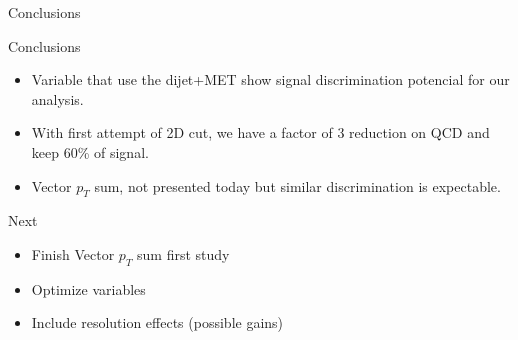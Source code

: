 \documentclass[8pt]{beamer}
\begin{document}
\begin{frame}{Conclusions}
 
\begin{block}{Conclusions}
  
  \begin{itemize}
    \item Variable that use the dijet+MET show signal discrimination potencial for our analysis.
    \item With first attempt of 2D cut, we have a factor of 3 reduction on QCD and keep 60\% of signal.
    \item Vector $p_{T}$ sum, not presented today but similar discrimination is expectable.
  \end{itemize}

\end{block}

\begin{block}{Next}

  \begin{itemize}
    \item Finish Vector $p_{T}$ sum first study
    \item Optimize variables 
    \item Include resolution effects (possible gains)
  \end{itemize}

\end{block}

\end{frame}
\end{document}
